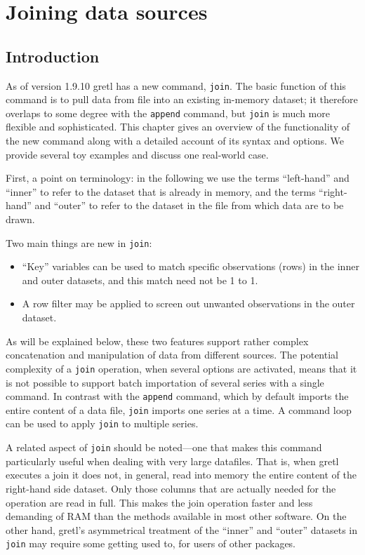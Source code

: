 \chapter{Joining data sources}
\label{chap:join}

\section{Introduction}

As of version 1.9.10 gretl has a new command, \texttt{join}. The basic
function of this command is to pull data from file into an existing
in-memory dataset; it therefore overlaps to some degree with the
\texttt{append} command, but \texttt{join} is much more flexible and
sophisticated. This chapter gives an overview of the functionality of
the new command along with a detailed account of its syntax and
options. We provide several toy examples and discuss one real-world
case.

First, a point on terminology: in the following we use the terms 
``left-hand'' and ``inner'' to refer to the dataset that is already in
memory, and the terms ``right-hand'' and ``outer'' to refer to the
dataset in the file from which data are to be drawn. 

Two main things are new in \texttt{join}: 
\begin{itemize}
\item ``Key'' variables can be used to match specific observations
  (rows) in the inner and outer datasets, and this match need not be
  1 to 1.
\item A row filter may be applied to screen out unwanted observations
  in the outer dataset.
\end{itemize}

As will be explained below, these two features support rather complex
concatenation and manipulation of data from different sources. The
potential complexity of a \texttt{join} operation, when several
options are activated, means that it is not possible to support batch
importation of several series with a single command. In contrast with
the \texttt{append} command, which by default imports the entire
content of a data file, \texttt{join} imports one series at a time. A
command loop can be used to apply \texttt{join} to multiple series.

A related aspect of \texttt{join} should be noted---one that makes
this command particularly useful when dealing with very large
datafiles.  That is, when gretl executes a join it does not, in
general, read into memory the entire content of the right-hand side
dataset.  Only those columns that are actually needed for the
operation are read in full. This makes the join operation faster and
less demanding of RAM than the methods available in most other
software. On the other hand, gretl's asymmetrical treatment of the
``inner'' and ``outer'' datasets in \texttt{join} may require some
getting used to, for users of other packages.

